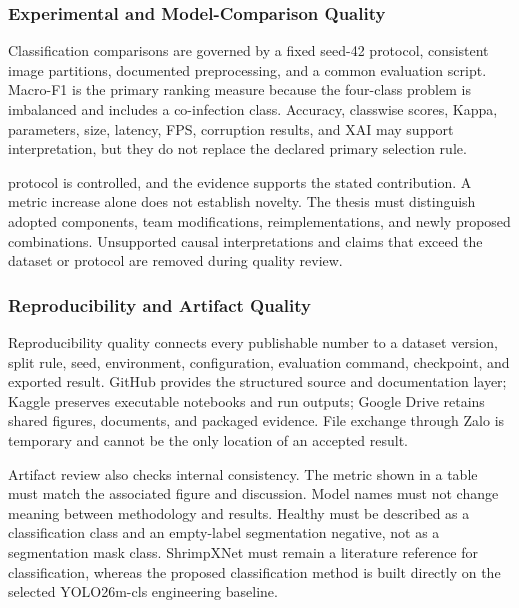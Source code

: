 \subsubsection{Experimental and Model-Comparison Quality}
Classification comparisons are governed by a fixed seed-42 protocol, consistent image partitions, documented preprocessing, and a common evaluation script. Macro-F1 is the primary ranking measure because the four-class problem is imbalanced and includes a co-infection class. Accuracy, classwise scores, Kappa, parameters, size, latency, FPS, corruption results, and XAI may support interpretation, but they do not replace the declared primary selection rule.\par
{}
protocol is controlled, and the evidence supports the stated contribution. A metric increase alone does not establish novelty. The thesis must distinguish adopted components, team modifications, reimplementations, and newly proposed combinations. Unsupported causal interpretations and claims that exceed the dataset or protocol are removed during quality review.\par
\subsubsection{Reproducibility and Artifact Quality}
Reproducibility quality connects every publishable number to a dataset version, split rule, seed, environment, configuration, evaluation command, checkpoint, and exported result. GitHub provides the structured source and documentation layer; Kaggle preserves executable notebooks and run outputs; Google Drive retains shared figures, documents, and packaged evidence. File exchange through Zalo is temporary and cannot be the only location of an accepted result.\par
Artifact review also checks internal consistency. The metric shown in a table must match the associated figure and discussion. Model names must not change meaning between methodology and results. Healthy must be described as a classification class and an empty-label segmentation negative, not as a segmentation mask class. ShrimpXNet must remain a literature reference for classification, whereas the proposed classification method is built directly on the selected YOLO26m-cls engineering baseline.\par
